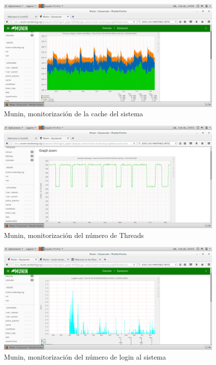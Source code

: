 \begin{figure}[H] %
\centering
\includegraphics[scale=0.4]{./imagenes/P3_6_1.png} 
\caption{Munin, monitorización de la cache del sistema} \label{fig:P3_6_1}
\end{figure}

\begin{figure}[H] %
\centering
\includegraphics[scale=0.4]{./imagenes/P3_6_2.png} 
\caption{Munin, monitorización del número de Threads} \label{fig:P3_6_2}
\end{figure}

\begin{figure}[H] %
\centering
\includegraphics[scale=0.4]{./imagenes/P3_6_3.png} 
\caption{Munin, monitorización del número de login al sistema} \label{fig:P3_6_3}
\end{figure}

